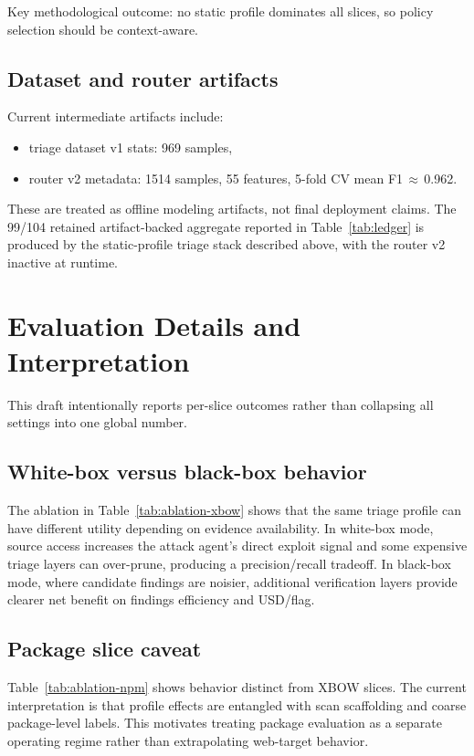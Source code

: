 \documentclass[11pt]{article}
\begin{document}
Key methodological outcome: no static profile dominates all slices, so policy
selection should be context-aware.

\subsection{Dataset and router artifacts}

Current intermediate artifacts include:

\begin{itemize}
  \item triage dataset v1 stats: 969 samples,
  \item router v2 metadata: 1514 samples, 55 features, 5-fold CV mean
  F1\,$\approx$\,0.962.
\end{itemize}

These are treated as offline modeling artifacts, not final deployment claims.
The 99/104 retained artifact-backed aggregate reported in Table~\ref{tab:ledger}
is produced by the static-profile triage stack described above, with the
router v2 inactive at runtime.

\section{Evaluation Details and Interpretation}

This draft intentionally reports per-slice outcomes rather than collapsing all
settings into one global number.

\subsection{White-box versus black-box behavior}

The ablation in Table~\ref{tab:ablation-xbow} shows that the same triage
profile can have different utility depending on evidence availability. In
white-box mode, source access increases the attack agent's direct exploit signal
and some expensive triage layers can over-prune, producing a precision/recall
tradeoff. In black-box mode, where candidate findings are noisier, additional
verification layers provide clearer net benefit on findings efficiency and
USD/flag.

\subsection{Package slice caveat}

Table~\ref{tab:ablation-npm} shows behavior distinct from XBOW slices. The
current interpretation is that profile effects are entangled with scan
scaffolding and coarse package-level labels. This motivates treating package
evaluation as a separate operating regime rather than extrapolating web-target
behavior.
\end{document}
